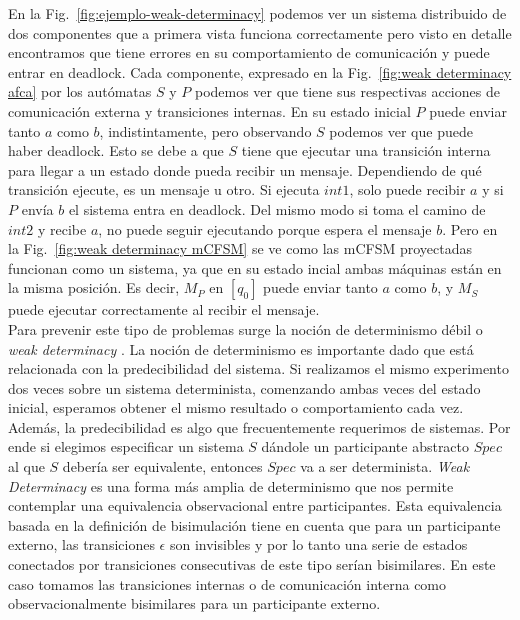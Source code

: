 En la Fig.~\ref{fig:ejemplo-weak-determinacy} podemos ver un sistema distribuido de dos componentes que a primera vista funciona correctamente pero visto en detalle encontramos que tiene errores en su comportamiento de comunicación y puede entrar en deadlock. Cada componente, expresado en la Fig.~\ref{fig:weak determinacy afca} por los autómatas $S$ y $P$ podemos ver que tiene sus respectivas acciones de comunicación externa y transiciones internas. En su estado inicial $P$ puede enviar tanto $a$ como $b$, indistintamente, pero observando $S$ podemos ver que puede haber deadlock. Esto se debe a que $S$ tiene que ejecutar una transición interna para llegar a un estado donde pueda recibir un mensaje. Dependiendo de qué transición ejecute, es un mensaje u otro. Si ejecuta $int1$, solo puede recibir $a$ y si $P$ envía $b$ el sistema entra en deadlock. Del mismo modo si toma el camino de $int2$ y recibe $a$, no puede seguir ejecutando porque espera el mensaje $b$. Pero en la Fig.~\ref{fig:weak determinacy mCFSM} se ve como las mCFSM proyectadas funcionan como un sistema, ya que en su estado incial ambas máquinas están en la misma posición. Es decir, $M_P$ en $[q_0]$ puede enviar tanto $a$ como $b$, y $M_S$ puede ejecutar correctamente al recibir el mensaje.\\

Para prevenir este tipo de problemas surge la noción de determinismo débil o \emph{weak determinacy} \cite[Chap.~11, Def.~3]{milner89}. La noción de determinismo es importante dado que está relacionada con la predecibilidad del sistema. Si realizamos el mismo experimento dos veces sobre un sistema determinista, comenzando ambas veces del estado inicial, esperamos obtener el mismo resultado o comportamiento cada vez. Además, la predecibilidad es algo que frecuentemente requerimos de sistemas. Por ende si elegimos especificar un sistema $S$ dándole un participante abstracto $Spec$ al que $S$ debería ser equivalente, entonces $Spec$ va a ser determinista. \emph{Weak Determinacy} es una forma más amplia de determinismo que nos permite contemplar una equivalencia observacional entre participantes. Esta equivalencia basada en la definición de bisimulación tiene en cuenta que para un participante externo, las transiciones $\epsilon$ son invisibles y por lo tanto una serie de estados conectados por transiciones consecutivas de este tipo serían bisimilares. En este caso tomamos las transiciones internas o de comunicación interna como observacionalmente bisimilares para un participante externo.  

